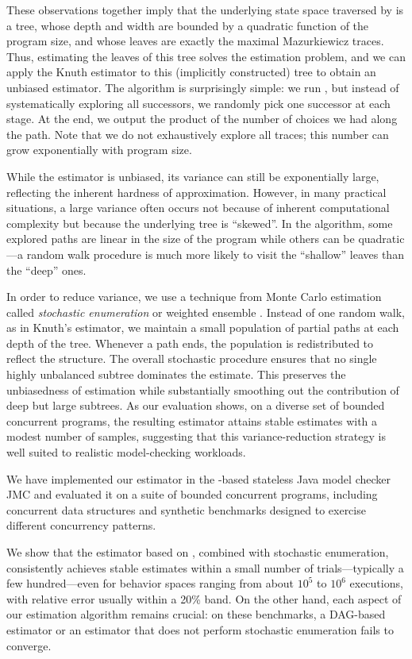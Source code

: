 These observations together imply that the underlying state space traversed by \trust is a tree, whose depth and width are bounded by a quadratic function of the program size,
and whose leaves are exactly the maximal Mazurkiewicz traces.
Thus, estimating the leaves of this tree solves the estimation problem,
and we can apply the Knuth estimator to this (implicitly constructed) tree to obtain an unbiased estimator.
The algorithm is surprisingly simple: we run \trust, but instead of systematically exploring all successors, we randomly pick one successor at each stage.
At the end, we output the product of the number of choices we had along the path.
Note that we do not exhaustively explore all traces; this number can grow exponentially with program size.

While the estimator is unbiased, its variance can still be exponentially large,
reflecting the inherent hardness of approximation.
However, in many practical situations, a large variance often occurs not because of inherent computational complexity but because the underlying tree is ``skewed''.
In the \trust algorithm, some explored paths are linear in the size of the program while others can
be quadratic---a random walk procedure is much more likely to visit the ``shallow'' leaves than the ``deep'' ones.

In order to reduce variance, we use a technique from Monte Carlo estimation called \emph{stochastic enumeration} \cite{rubinstein, vaisman2017} or weighted ensemble \cite{huberkim}.
Instead of one random walk, as in Knuth's estimator, we maintain a small population of partial paths at each depth of the tree.
Whenever a path ends, the population is redistributed to reflect the structure.
The overall stochastic procedure ensures that no single highly unbalanced subtree dominates the
estimate.
This preserves the unbiasedness of estimation while substantially smoothing out the contribution
of deep but large subtrees.
As our evaluation shows, on a diverse set of bounded concurrent programs, the
resulting estimator attains stable estimates with a modest number of samples,
suggesting that this variance-reduction strategy is well suited to realistic
model-checking workloads.

We have implemented our estimator in the \dpor-based stateless Java model checker JMC and evaluated it on a suite of bounded concurrent programs, including concurrent data structures 
and synthetic benchmarks designed to exercise different concurrency patterns.

We show that the estimator based on \trust, combined with stochastic enumeration, consistently achieves stable estimates within a small number of trials---typically a few hundred---even 
for behavior spaces ranging from about \(10^{5}\) to \(10^{6}\)
executions, with relative error usually within a 20\% band.
On the other hand, each aspect of our estimation algorithm remains 
crucial: on these benchmarks, a DAG-based estimator or an estimator that does not perform stochastic enumeration fails to converge.

